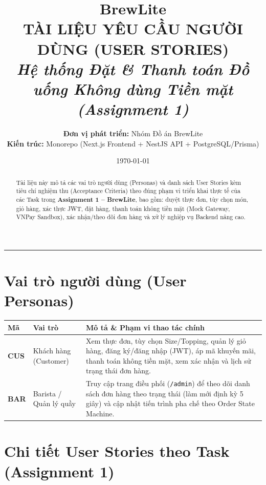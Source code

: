 \documentclass[12pt,a4paper]{article}
\title{
    \vspace{-1.5cm}
    \Huge\textbf{\textcolor{brandblue}{BrewLite}}\\
    \vspace{0.3cm}
    \Large\textbf{TÀI LIỆU YÊU CẦU NGƯỜI DÙNG (USER STORIES)}\\
    \large\textit{Hệ thống Đặt \& Thanh toán Đồ uống Không dùng Tiền mặt (Assignment 1)}
}
\author{
    \textbf{Đơn vị phát triển:} Nhóm Đồ án BrewLite \\
    \textbf{Kiến trúc:} Monorepo (Next.js Frontend + NestJS API + PostgreSQL/Prisma)
}
\date{\today}
\begin{document}
\maketitle
\vspace{0.5cm}

\begin{abstract}
Tài liệu này mô tả các vai trò người dùng (Personas) và danh sách User Stories kèm tiêu chí nghiệm thu (Acceptance Criteria) theo đúng phạm vi triển khai thực tế của các Task trong \textbf{Assignment 1 -- BrewLite}, bao gồm: duyệt thực đơn, tùy chọn món, giỏ hàng, xác thực JWT, đặt hàng, thanh toán không tiền mặt (Mock Gateway, VNPay Sandbox), xác nhận/theo dõi đơn hàng và xử lý nghiệp vụ Backend nâng cao.
\end{abstract}

\vspace{0.4cm}
\tableofcontents
\vspace{0.6cm}
\hrule
\vspace{0.6cm}

\section{Vai trò người dùng (User Personas)}

\begin{table}[h!]
\centering
\begin{tabularx}{\textwidth}{l p{4cm} X}
\toprule
\textbf{Mã} & \textbf{Vai trò} & \textbf{Mô tả \& Phạm vi thao tác chính} \\
\midrule
\textbf{CUS} & Khách hàng (Customer) & Xem thực đơn, tùy chọn Size/Topping, quản lý giỏ hàng, đăng ký/đăng nhập (JWT), áp mã khuyến mãi, thanh toán không tiền mặt, xem xác nhận và lịch sử trạng thái đơn hàng. \\
\addlinespace
\textbf{BAR} & Barista / Quản lý quầy & Truy cập trang điều phối (\texttt{/admin}) để theo dõi danh sách đơn hàng theo trạng thái (làm mới định kỳ 5 giây) và cập nhật tiến trình pha chế theo Order State Machine. \\
\bottomrule
\end{tabularx}
\end{table}

\newpage

\section{Chi tiết User Stories theo Task (Assignment 1)}
\end{document}
